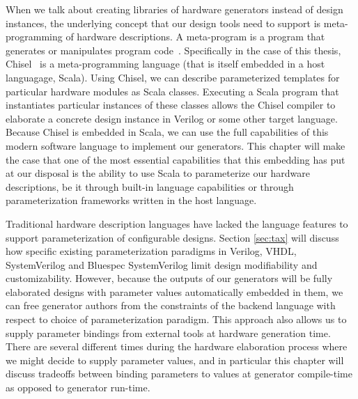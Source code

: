 When we talk about creating libraries of hardware generators instead of design instances,
the underlying concept that our design tools need to support is meta-programming of hardware descriptions.
A meta-program is a program that generates or manipulates program code~\cite{templates}.
Specifically in the case of this thesis, Chisel~\cite{chisel} is a meta-programming language (that is itself embedded in a host languagage, Scala).
Using Chisel, we can describe parameterized templates for particular hardware modules as Scala classes.
Executing a Scala program that instantiates particular instances of these classes allows the Chisel compiler
to elaborate a concrete design instance in Verilog or some other target language.
Because Chisel is embedded in Scala, we can use the full capabilities of this modern software language to implement our generators.
This chapter will make the case that one of the most essential capabilities that this embedding has put at our disposal
is the ability to use Scala to parameterize our hardware descriptions,
be it through built-in language capabilities or through parameterization frameworks written in the host language.

Traditional hardware description languages have lacked the language features to support parameterization of configurable designs.
Section \ref{sec:tax} will discuss how specific existing parameterization paradigms in Verilog, VHDL, SystemVerilog and Bluespec SystemVerilog limit design modifiability and customizability.
However, because the outputs of our generators will be fully elaborated designs with parameter values  automatically embedded in them,
we can free generator authors from the constraints of the backend language with respect to choice of parameterization paradigm.
This approach also allows us to supply parameter bindings from external tools at hardware generation time.
There are several different times during the hardware elaboration process where we might decide to supply parameter values, and in particular this chapter will discuss tradeoffs between
binding parameters to values at generator compile-time as opposed to generator run-time.


